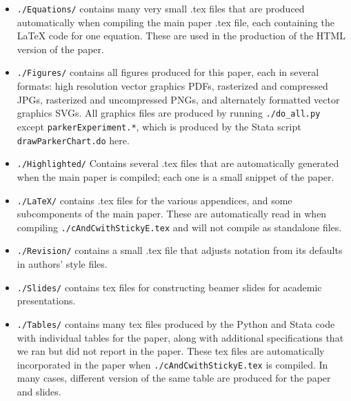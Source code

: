 \documentclass[12pt,pdftex,letterpaper]{article}
\begin{document}
\begin{itemize}
\begin{itemize}
\end{itemize}

\item \texttt{./Equations/} contains many very small .tex files that are produced automatically when compiling the main paper .tex file, each containing the LaTeX code for one equation.  These are used in the production of the HTML version of the paper.

\item \texttt{./Figures/} contains all figures produced for this paper, each in several formats: high resolution vector graphics PDFs, rasterized and compressed JPGs, rasterized and uncompressed PNGs, and alternately formatted vector graphics SVGs.  All graphics files are produced by running \texttt{./do\_all.py} except \texttt{parkerExperiment.*}, which is produced by the Stata script \texttt{drawParkerChart.do} here.

\item \texttt{./Highlighted/} Contains several .tex files that are automatically generated when the main paper is compiled; each one is a small snippet of the paper.

\item \texttt{./LaTeX/} contains .tex files for the various appendices, and some subcomponents of the main paper.  These are automatically read in when compiling \texttt{./cAndCwithStickyE.tex} and will not compile as standalone files.

\item \texttt{./Revision/} contains a small .tex file that adjusts notation from its defaults in authors' style files.

\item \texttt{./Slides/} contains tex files for constructing beamer slides for academic presentations.

\item \texttt{./Tables/} contains many tex files produced by the Python and Stata code with individual tables for the paper, along with additional specifications that we ran but did not report in the paper.  These tex files are automatically incorporated in the paper when \texttt{./cAndCwithStickyE.tex} is compiled.  In many cases, different version of the same table are produced for the paper and slides.

\end{itemize}
\end{document}
